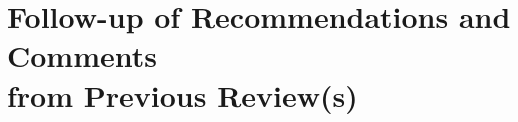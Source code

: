 
\clearpage
\section[Follow-up of Recommendations and Comments from Previous Review(s)]{\texorpdfstring{Follow-up of Recommendations and Comments\\from Previous Review(s)}{Follow-up of Recommendations and Comments from Previous Review(s)}}
\label{sec:follow-up-reviews}
